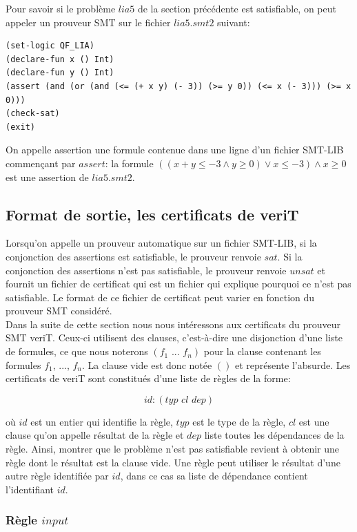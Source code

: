 \documentclass[11pt]{article}
\begin{document}
Pour savoir si le problème $lia5$ de la section précédente est satisfiable, on peut appeler un prouveur SMT sur le fichier $lia5.smt2$ suivant:
\begin{lstlisting}[frame=single]
(set-logic QF_LIA)
(declare-fun x () Int)
(declare-fun y () Int)
(assert (and (or (and (<= (+ x y) (- 3)) (>= y 0)) (<= x (- 3))) (>= x 0)))
(check-sat)
(exit)
\end{lstlisting}

On appelle assertion une formule contenue dans une ligne d'un fichier SMT-LIB commençant par $assert$: la formule $((x + y \leq -3 \wedge y \geq 0) \vee x \leq -3) \wedge x \geq 0$ est une assertion de $lia5.smt2$.


\subsection{Format de sortie, les certificats de veriT} \label{sortie}

Lorsqu'on appelle un prouveur automatique sur un fichier SMT-LIB, si la conjonction des assertions est satisfiable, le prouveur renvoie $sat$. Si la conjonction des assertions n'est pas satisfiable, le prouveur renvoie $unsat$ et fournit un fichier de certificat qui est un fichier qui explique pourquoi ce n'est pas satisfiable. Le format de ce fichier de certificat peut varier en fonction du prouveur SMT considéré. \\


Dans la suite de cette section nous nous intéressons aux certificats du prouveur SMT veriT. Ceux-ci utilisent des clauses, c'est-à-dire une disjonction d'une liste de formules, ce que nous noterons $(f_1 \,\,  ... \,\, f_n)$ pour la clause contenant les formules $f_1$, ..., $f_n$. La clause vide est donc notée $()$ et représente l'absurde. Les certificats de veriT sont constitués d'une liste de règles de la forme: 

\[id:(typ \,\, cl \,\, dep)\]

où $id$ est un entier qui identifie la règle, $typ$ est le type de la règle, $cl$ est une clause qu'on appelle résultat de la règle et $dep$ liste toutes les dépendances de la règle.  Ainsi, montrer que le problème n'est pas satisfiable revient à obtenir une règle dont le résultat est la clause vide. Une règle peut utiliser le résultat d'une autre règle identifiée par $id$, dans ce cas sa liste de dépendance contient l'identifiant $id$.

\subsubsection{Règle $input$}
\end{document}
